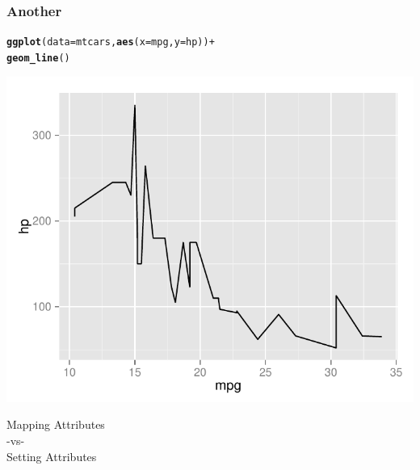 \documentclass[12pt]{beamer}\usepackage[]{graphicx}\usepackage[]{color}
\makeatletter
\newcommand{\hlopt}[1]{\textcolor[rgb]{0,0,0}{#1}}%
\newcommand{\hlstd}[1]{\textcolor[rgb]{0.345,0.345,0.345}{#1}}%
\newcommand{\hlkwc}[1]{\textcolor[rgb]{0.333,0.667,0.333}{#1}}%
\newcommand{\hlkwd}[1]{\textcolor[rgb]{0.737,0.353,0.396}{\textbf{#1}}}%
\newenvironment{kframe}{%
 \def\at@end@of@kframe{}%
 \ifinner\ifhmode%
  \def\at@end@of@kframe{\end{minipage}}%
  \begin{minipage}{\columnwidth}%
 \fi\fi%
 \def\FrameCommand##1{\hskip\@totalleftmargin \hskip-\fboxsep
 \colorbox{shadecolor}{##1}\hskip-\fboxsep
     \hskip-\linewidth \hskip-\@totalleftmargin \hskip\columnwidth}%
 \MakeFramed {\advance\hsize-\width
   \@totalleftmargin\z@ \linewidth\hsize
   \@setminipage}}%
 {\par\unskip\endMakeFramed%
 \at@end@of@kframe}
\newenvironment{knitrout}{}{} %
\makeatother
\begin{document}
\begin{frame}[fragile]
\frametitle{Another }
\begin{knitrout}\scriptsize
{}\color{fgcolor}\begin{kframe}
\begin{alltt}
\hlkwd{ggplot}\hlstd{(}\hlkwc{data} \hlstd{= mtcars,} \hlkwd{aes}\hlstd{(}\hlkwc{x} \hlstd{= mpg,} \hlkwc{y} \hlstd{= hp))} \hlopt{+}
  \hlkwd{geom_line}\hlstd{()}
\end{alltt}
\end{kframe}

{\centering \includegraphics[width=.7\linewidth,height=.6\linewidth]{figure/unnamed-chunk-2-1} 

}



\end{knitrout}
\end{frame}


\begin{frame}
\begin{center}
\Huge{{\hilit Mapping Attributes \\ 
-vs- \\
Setting Attributes}}
\end{center}
\end{frame}

\end{document}
